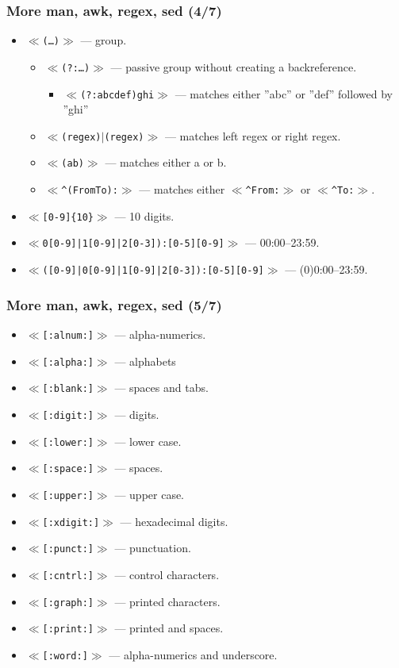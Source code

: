 \documentclass[aspectratio=169, xcolor=table, notheorems, hyperref={pdfpagelabels=false}]{beamer}
\begin{document}
\begin{frame}[fragile]
\frametitle{More man, awk, regex, sed (4/7)}
\begin{itemize}
\item $\ll$\texttt{(\ldots)}$\gg$ --- group.
\begin{itemize}
\item $\ll$\texttt{(?:\ldots)}$\gg$ --- passive group without creating a backreference.
\begin{itemize}
\item $\ll$\texttt{(?:abc\textbar{}def)ghi}$\gg$ --- matches either ''abc'' or ''def'' followed by ''ghi''
\end{itemize}
\item $\ll$\texttt{(regex)$\mid$(regex)}$\gg$ --- matches left regex or right regex.
\item $\ll$\texttt{(a\textbar{}b)}$\gg$ --- matches either a or b.
\item $\ll$\texttt{\^{}(From\textbar{}To):}$\gg$ --- matches either $\ll$\texttt{\^{}From:}$\gg$ or
      $\ll$\texttt{\^{}To:}$\gg$.
\end{itemize}
\item $\ll$\texttt{[0-9]\{10\}}$\gg$ --- 10 digits.
\item $\ll$\texttt{0[0-9]|1[0-9]|2[0-3]):[0-5][0-9]}$\gg$ --- 00:00--23:59.
\item $\ll$\texttt{([0-9]|0[0-9]|1[0-9]|2[0-3]):[0-5][0-9]}$\gg$ --- (0)0:00--23:59.
\end{itemize}
\end{frame}


\begin{frame}[fragile]
\frametitle{More man, awk, regex, sed (5/7)}
\begin{itemize}
\item $\ll$\texttt{[:alnum:]}$\gg$ --- alpha-numerics.
\item $\ll$\texttt{[:alpha:]}$\gg$ --- alphabets
\item $\ll$\texttt{[:blank:]}$\gg$ --- spaces and tabs.
\item $\ll$\texttt{[:digit:]}$\gg$ --- digits.
\item $\ll$\texttt{[:lower:]}$\gg$ --- lower case.
\item $\ll$\texttt{[:space:]}$\gg$ --- spaces.
\item $\ll$\texttt{[:upper:]}$\gg$ --- upper case.
\item $\ll$\texttt{[:xdigit:]}$\gg$ --- hexadecimal digits.
\item $\ll$\texttt{[:punct:]}$\gg$ --- punctuation.
\item $\ll$\texttt{[:cntrl:]}$\gg$ --- control characters.
\item $\ll$\texttt{[:graph:]}$\gg$ --- printed characters.
\item $\ll$\texttt{[:print:]}$\gg$ --- printed and spaces.
\item $\ll$\texttt{[:word:]}$\gg$ --- alpha-numerics and underscore.
\end{itemize}
\end{frame}
\end{document}
